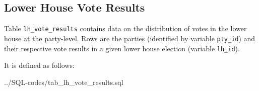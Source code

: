 \subsection{Lower House Vote Results}\label{subsec_tab_lh_vote_results}
Table \texttt{\footnotesize lh\_vote\_results} contains data on the distribution of votes in the lower house at the party-level. 
Rows are the parties (identified by variable \texttt{\footnotesize pty\_id}) and their respective vote results in a given lower house election (variable \texttt{\footnotesize lh\_id}).


It is defined as follows: 

%
{../SQL-codes/tab_lh_vote_results.sql}

